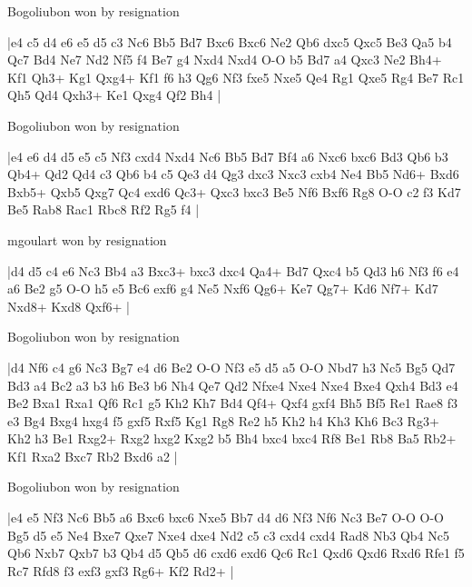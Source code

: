 \showboard

Bogoliubon won by resignation

\makegametitle
|e4 c5 d4 e6 e5 d5 c3 Nc6 Bb5 Bd7 Bxc6 Bxc6 Ne2 Qb6 dxc5 Qxc5 Be3 Qa5 b4 Qc7 Bd4 Ne7 Nd2 Nf5 f4 Be7 g4 Nxd4 Nxd4 O-O b5 Bd7 a4 Qxc3 Ne2 Bh4+ Kf1 Qh3+ Kg1 Qxg4+ Kf1 f6 h3 Qg6 Nf3 fxe5 Nxe5 Qe4 Rg1 Qxe5 Rg4 Be7 Rc1 Qh5 Qd4 Qxh3+ Ke1 Qxg4 Qf2 Bh4  |

\showboard

Bogoliubon won by resignation

\makegametitle
|e4 e6 d4 d5 e5 c5 Nf3 cxd4 Nxd4 Nc6 Bb5 Bd7 Bf4 a6 Nxc6 bxc6 Bd3 Qb6 b3 Qb4+ Qd2 Qd4 c3 Qb6 b4 c5 Qe3 d4 Qg3 dxc3 Nxc3 cxb4 Ne4 Bb5 Nd6+ Bxd6 Bxb5+ Qxb5 Qxg7 Qc4 exd6 Qc3+ Qxc3 bxc3 Be5 Nf6 Bxf6 Rg8 O-O c2 f3 Kd7 Be5 Rab8 Rac1 Rbc8 Rf2 Rg5 f4  |

\showboard

mgoulart won by resignation

\makegametitle
|d4 d5 c4 e6 Nc3 Bb4 a3 Bxc3+ bxc3 dxc4 Qa4+ Bd7 Qxc4 b5 Qd3 h6 Nf3 f6 e4 a6 Be2 g5 O-O h5 e5 Bc6 exf6 g4 Ne5 Nxf6 Qg6+ Ke7 Qg7+ Kd6 Nf7+ Kd7 Nxd8+ Kxd8 Qxf6+  |

\showboard

Bogoliubon won by resignation

\makegametitle
|d4 Nf6 c4 g6 Nc3 Bg7 e4 d6 Be2 O-O Nf3 e5 d5 a5 O-O Nbd7 h3 Nc5 Bg5 Qd7 Bd3 a4 Bc2 a3 b3 h6 Be3 b6 Nh4 Qe7 Qd2 Nfxe4 Nxe4 Nxe4 Bxe4 Qxh4 Bd3 e4 Be2 Bxa1 Rxa1 Qf6 Rc1 g5 Kh2 Kh7 Bd4 Qf4+ Qxf4 gxf4 Bh5 Bf5 Re1 Rae8 f3 e3 Bg4 Bxg4 hxg4 f5 gxf5 Rxf5 Kg1 Rg8 Re2 h5 Kh2 h4 Kh3 Kh6 Bc3 Rg3+ Kh2 h3 Be1 Rxg2+ Rxg2 hxg2 Kxg2 b5 Bh4 bxc4 bxc4 Rf8 Be1 Rb8 Ba5 Rb2+ Kf1 Rxa2 Bxc7 Rb2 Bxd6 a2  |

\showboard

Bogoliubon won by resignation

\makegametitle
|e4 e5 Nf3 Nc6 Bb5 a6 Bxc6 bxc6 Nxe5 Bb7 d4 d6 Nf3 Nf6 Nc3 Be7 O-O O-O Bg5 d5 e5 Ne4 Bxe7 Qxe7 Nxe4 dxe4 Nd2 c5 c3 cxd4 cxd4 Rad8 Nb3 Qb4 Nc5 Qb6 Nxb7 Qxb7 b3 Qb4 d5 Qb5 d6 cxd6 exd6 Qc6 Rc1 Qxd6 Qxd6 Rxd6 Rfe1 f5 Rc7 Rfd8 f3 exf3 gxf3 Rg6+ Kf2 Rd2+  |

